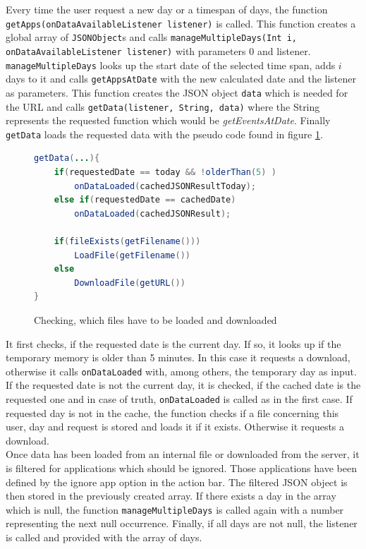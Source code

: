 Every  time the user request a new day or a timespan of days, the function \lstinline$getApps(onDataAvailableListener listener)$ is called. This function creates a global array of \lstinline$JSONObject$s and calls \lstinline$manageMultipleDays(Int i, onDataAvailableListener listener)$ with parameters 0 and listener. \lstinline$manageMultipleDays$ looks up the start date of the selected time span, adds $i$ days to it and calls \lstinline$getAppsAtDate$ with the new calculated date and the listener as parameters. This function creates the JSON object \lstinline$data$ which is needed for the URL and calls \lstinline$getData(listener, String, data)$ where the String represents the requested function which would be \emph{getEventsAtDate}. Finally \lstinline$getData$ loads the requested data with the pseudo code found in figure \ref{fig:loaddata}. 
\begin{figure}
\caption{Checking, which files have to be loaded and downloaded}
\label{fig:loaddata}
\begin{lstlisting}[language=java,firstnumber=1,stepnumber=1, numberstyle=\scriptsize]
getData(...){
	if(requestedDate == today && !olderThan(5) )
		onDataLoaded(cachedJSONResultToday);
	else if(requestedDate == cachedDate)
		onDataLoaded(cachedJSONResult);
	
	if(fileExists(getFilename()))
		LoadFile(getFilename())
	else
		DownloadFile(getURL())
}
\end{lstlisting}
\end{figure}
It first checks, if the requested date is the current day. If so, it looks up if the temporary memory is older than 5 minutes. In this case it requests a download, otherwise it calls \lstinline$onDataLoaded$ with, among others, the temporary day as input. If the requested date is not the current day, it is checked, if the cached date is the requested one and in case of truth, \lstinline$onDataLoaded$ is called as in the first case. If requested day is not in the cache, the function checks if a file concerning this user, day and request is stored and loads it if it exists. Otherwise it requests a download.\\
Once data has been loaded from an internal file or downloaded from the server, it is filtered for applications which should be ignored. Those applications have been defined by the ignore app option in the action bar. The filtered JSON object is then stored in the previously created array. If there exists a day in the array which is null, the function \lstinline$manageMultipleDays$ is called again with a number representing the next null occurrence. Finally, if all days are not null, the listener is called and provided with the array of days.

